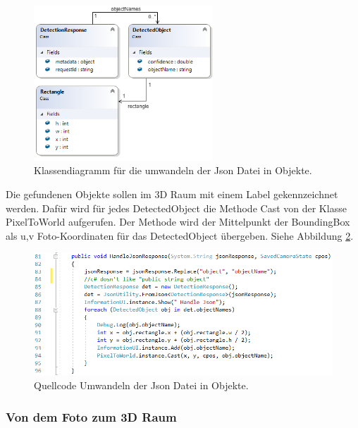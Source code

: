 \begin{figure}[H]
	\centering
	\includegraphics[width=0.6\textwidth]{images/dia_json.PNG}
	\caption[Klassendiagramm für Json umwandelung]{Klassendiagramm für die umwandeln der Json Datei in Objekte.}
	\label{dia:jsonClasses}
\end{figure}

Die gefundenen Objekte sollen im 3D Raum mit einem Label gekennzeichnet werden. 
Dafür wird für jedes DetectedObject die Methode Cast von der Klasse PixelToWorld aufgerufen. Der Methode wird der Mittelpunkt der BoundingBox als u,v Foto-Koordinaten für das DetectedObject übergeben. Siehe Abbildung \ref{code:handlejson}.

\begin{figure}[H]
	\centering
	\includegraphics[width=1\textwidth]{images/code_handleJson.PNG}
	\caption[Quellcode Umwandelung der Json Datei in Objekte]{Quellcode Umwandeln der Json Datei in Objekte.}
	\label{code:handlejson}
\end{figure}

\subsubsection{Von dem Foto zum 3D Raum}


